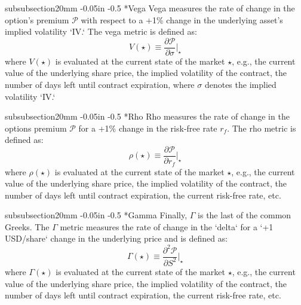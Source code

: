 \documentclass[11pt]{article}
\makeatletter
\theoremstyle{definition}
\renewcommand\subsubsection{\@startsection
	{subsubsection}{2}{0mm}
	{-0.05in}
	{-0.5\baselineskip}
	{\normalfont\normalsize\itshape\bfseries}}
\makeatother
\begin{document}
\subsubsection*{Vega}
Vega measures the rate of change in the option's premium $\mathcal{P}$ with respect to a +1\% change in the underlying asset's implied volatility `IV.` 
The vega metric is defined as:
\begin{equation}
V(\star) \equiv \frac{\partial\mathcal{P}}{\partial{\sigma}}\Biggr|_{\star}
\end{equation}
where $V(\star)$ is evaluated at the current state of the market $\star$, e.g., the current value of the underlying share price, the implied volatility of the contract, the number of days left until contract expiration,
where $\sigma$ denotes the implied volatility `IV.` 

\subsubsection*{Rho}
Rho measures the rate of change in the options premium $\mathcal{P}$ for a +1\% change in the risk-free rate $r_{f}$. The rho metric is defined as:
\begin{equation}
\rho(\star)\equiv\frac{\partial\mathcal{P}}{\partial{r_{f}}}\Biggr|_{\star}
\end{equation}
where $\rho(\star)$ is evaluated at the current state of the market $\star$, e.g., the current value of the underlying share price, the implied volatility of the contract, the number of days left until contract expiration, 
the current risk-free rate, etc. 

\subsubsection*{Gamma}
Finally, $\Gamma$ is the last of the common Greeks. The $\Gamma$ metric measures the rate of change in the `delta` for a `+1 USD/share` change in the underlying price and is defined as:
\begin{equation}
\Gamma(\star) \equiv \frac{\partial^2\mathcal{P}}{\partial{S}^2}\Biggr|_{\star}
\end{equation}
where $\Gamma(\star)$ is evaluated at the current state of the market $\star$, e.g., the current value of the underlying share price, the implied volatility of the contract, 
the number of days left until contract expiration, the current risk-free rate, etc. 
\end{document}
